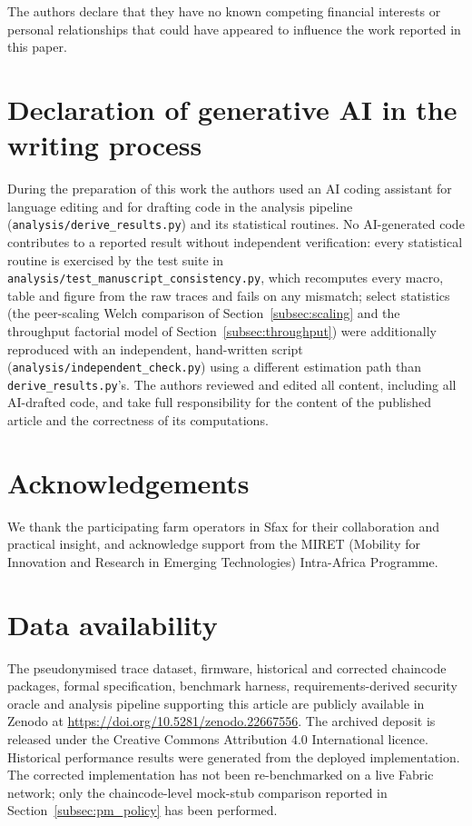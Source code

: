 \documentclass[a4paper,fleqn]{cas-sc}
\begin{document}
The authors declare that they have no known competing financial interests or
personal relationships that could have appeared to influence the work
reported in this paper.

\section*{Declaration of generative AI in the writing process}

During the preparation of this work the authors used an AI coding assistant
for language editing and for drafting code in the analysis pipeline
(\texttt{analysis/derive\_results.py}) and its statistical routines. No
AI-generated code contributes to a reported result without independent
verification: every statistical routine is exercised by the test suite in
\texttt{analysis/test\_manuscript\_consistency.py}, which recomputes every
macro, table and figure from the raw traces and fails on any mismatch;
select statistics (the peer-scaling Welch comparison of
Section~\ref{subsec:scaling} and the throughput factorial model of
Section~\ref{subsec:throughput}) were additionally reproduced with an
independent, hand-written script (\texttt{analysis/independent\_check.py})
using a different estimation path than \texttt{derive\_results.py}'s. The
authors reviewed and edited all content, including all AI-drafted code,
and take full responsibility for the content of the published article and
the correctness of its computations.

\section*{Acknowledgements}

We thank the participating farm operators in Sfax for their collaboration and
practical insight, and acknowledge support from the MIRET (Mobility for
Innovation and Research in Emerging Technologies) Intra-Africa Programme.

\section*{Data availability}

The pseudonymised trace dataset, firmware, historical and corrected
chaincode packages, formal specification, benchmark harness,
requirements-derived security oracle and analysis pipeline supporting this
article are publicly available in Zenodo at
\url{https://doi.org/10.5281/zenodo.22667556}. The archived deposit is
released under the Creative Commons Attribution 4.0 International licence.
Historical performance results were generated from the deployed
implementation. The corrected implementation has not been re-benchmarked
on a live Fabric network; only the chaincode-level mock-stub comparison
reported in Section~\ref{subsec:pm_policy} has been performed.

\clearpage


\end{document}
